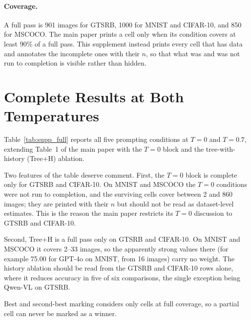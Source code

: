 \documentclass[10pt,twocolumn,letterpaper]{article}
\begin{document}
\paragraph{Coverage.} A full pass is 901 images for GTSRB, 1000 for MNIST and
CIFAR-10, and 850 for MSCOCO. The main paper prints a cell only when its
condition covers at least 90\% of a full pass. This supplement instead prints
every cell that has data and annotates the incomplete ones with their $n$, so
that what was and was not run to completion is visible rather than hidden.

\section{Complete Results at Both Temperatures}
\label{sec:supp_full}

Table~\ref{tab:supp_full} reports all five prompting conditions at $T{=}0$ and
$T{=}0.7$, extending Table~1 of the main paper with the $T{=}0$ block and the
tree-with-history (Tree+H) ablation.

Two features of the table deserve comment. First, the $T{=}0$ block is complete
only for GTSRB and CIFAR-10. On MNIST and MSCOCO the $T{=}0$ conditions were
not run to completion, and the surviving cells cover between 2 and 860 images;
they are printed with their $n$ but should not be read as dataset-level
estimates. This is the reason the main paper restricts its $T{=}0$ discussion to
GTSRB and CIFAR-10.

Second, Tree+H is a full pass only on GTSRB and CIFAR-10. On MNIST and MSCOCO
it covers 2--33 images, so the apparently strong values there (for example
75.00 for GPT-4o on MNIST, from 16 images) carry no weight. The
history ablation should be read from the GTSRB and CIFAR-10 rows alone, where
it reduces accuracy in five of six comparisons, the single exception being
Qwen-VL on GTSRB.

Best and second-best marking considers only cells at full coverage, so a
partial cell can never be marked as a winner.
\end{document}
